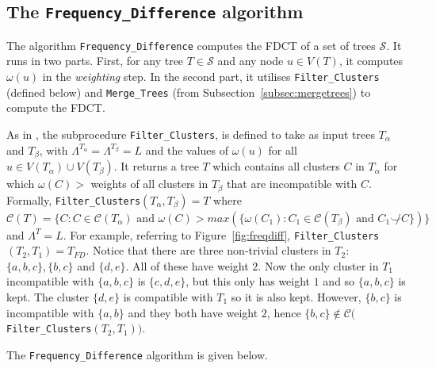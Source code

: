 \documentclass[12pt,a4paper]{article}
\newcommand{\compatible}{\smile}
\newcommand{\leafset}{\Lambda}
\newcommand{\weight}{\omega}
\newcommand{\TA}{T_\alpha}
\newcommand{\TB}{T_\beta}
\begin{document}
    \subsection{The \texttt{Frequency\_Difference} algorithm}

    The algorithm \texttt{Frequency\_Difference} \citep{jansson2018algorithms} computes the FDCT of a set of trees $\mathcal{S}$. It runs in two parts. First, for any tree $T \in \mathcal{S}$ and any node $u \in V(T)$, it computes $\weight(u)$ in the \textit{weighting} step. In the second part, it utilises \texttt{Filter\_Clusters} (defined below) and \texttt{Merge\_Trees} (from Subsection~\ref{subsec:mergetrees}) to compute the FDCT.

    As in \cite{jansson2018algorithms}, the subprocedure \texttt{Filter\_Clusters}, is defined to take as input trees $\TA$ and $\TB$, with $\leafset^{\TA} = \leafset^{\TB} = L$ and the values of $\weight(u)$ for all $u \in V(\TA) \cup V(\TB)$. It returns a tree $T$ which contains all clusters $C$ in $\TA$ for which $\weight(C) > $ weights of all clusters in $\TB$ that are incompatible with $C$. Formally, \texttt{Filter\_Clusters}$(\TA, \TB) = T$ where $\mathcal{C}(T) = \{C : C \in \mathcal{C}(\TA) \text{ and } \weight(C) > max(\{\weight(C_1) : C_1 \in \mathcal{C}(\TB) \text{ and } C_1 \not\compatible C\})\}$ and $\leafset^T = L$. For example, referring to Figure~\ref{fig:freqdiff}, \texttt{Filter\_Clusters}$(T_2, T_1) = T_{FD}$. Notice that there are three non-trivial clusters in $T_2$: $\{a, b, c\}, \{b, c\}$ and $\{d, e\}$. All of these have weight $2$. Now the only cluster in $T_1$ incompatible with $\{a, b, c\}$ is $\{c, d, e\}$, but this only has weight $1$ and so $\{a, b, c\}$ is kept. The cluster $\{d, e\}$ is compatible with $T_1$ so it is also kept. However, $\{b, c\}$ is incompatible with $\{a, b\}$ and they both have weight $2$, hence $\{b, c\} \not\in \mathcal{C}($\texttt{Filter\_Clusters}$(T_2, T_1))$.

    The \texttt{Frequency\_Difference} algorithm is given below.
\end{document}
